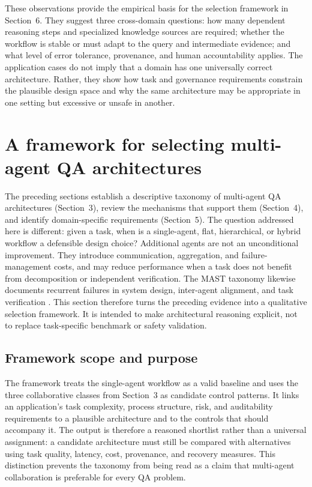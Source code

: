 \documentclass[a4paper,fleqn]{cas-dc}
\begin{document}
These observations provide the empirical basis for the selection framework in
Section~6. They suggest three cross-domain questions: how many dependent
reasoning steps and specialized knowledge sources are required; whether the
workflow is stable or must adapt to the query and intermediate evidence; and
what level of error tolerance, provenance, and human accountability applies.
The application cases do not imply that a domain has one universally correct
architecture. Rather, they show how task and governance requirements constrain
the plausible design space and why the same architecture may be appropriate
in one setting but excessive or unsafe in another.
\section{A framework for selecting multi-agent QA architectures}
\label{sec:guideline}

The preceding sections establish a descriptive taxonomy of multi-agent QA
architectures (Section~3), review the mechanisms that support them
(Section~4), and identify domain-specific requirements (Section~5). The
question addressed here is different: given a task, when is a single-agent,
flat, hierarchical, or hybrid workflow a defensible design choice? Additional
agents are not an unconditional improvement. They introduce communication,
aggregation, and failure-management costs, and may reduce performance when a
task does not benefit from decomposition or independent verification. The
MAST taxonomy likewise documents recurrent failures in system design,
inter-agent alignment, and task verification \citep{han2024mast}. This section
therefore turns the preceding evidence into a qualitative selection framework.
It is intended to make architectural reasoning explicit, not to replace
task-specific benchmark or safety validation.

\subsection{Framework scope and purpose}
\label{sec:framework_scope}

The framework treats the single-agent workflow as a valid baseline and uses
the three collaborative classes from Section~3 as candidate control patterns.
It links an application's task complexity, process structure, risk, and
auditability requirements to a plausible architecture and to the controls
that should accompany it. The output is therefore a reasoned shortlist rather
than a universal assignment: a candidate architecture must still be compared
with alternatives using task quality, latency, cost, provenance, and recovery
measures. This distinction prevents the taxonomy from being read as a claim
that multi-agent collaboration is preferable for every QA problem.
\end{document}

